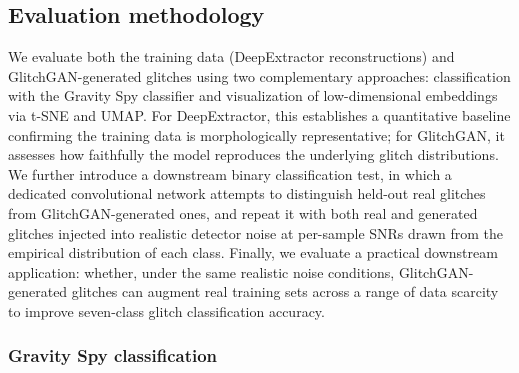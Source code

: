 \documentclass[reprint,nofootinbib,amsmath,amssymb,aps,floatfix]{revtex4-2}
\begin{document}
\subsection{Evaluation methodology}



We evaluate both the training data (DeepExtractor reconstructions) and GlitchGAN-generated glitches using two complementary approaches: classification with the Gravity Spy classifier and visualization of low-dimensional embeddings via t-SNE and UMAP. 
For DeepExtractor, this establishes a quantitative baseline confirming the training data is morphologically representative; for GlitchGAN, it assesses how faithfully the model reproduces the underlying glitch distributions.
We further introduce a downstream binary classification test, in which a dedicated convolutional network attempts to distinguish held-out real glitches from GlitchGAN-generated ones, and repeat it with both real and generated glitches injected into realistic detector noise at per-sample SNRs drawn from the empirical distribution of each class. 
Finally, we evaluate a practical downstream application: whether, under the same realistic noise conditions, GlitchGAN-generated glitches can augment real training sets across a range of data scarcity to improve seven-class glitch classification accuracy.

\subsubsection{Gravity Spy classification\label{sec:gspy_classification_methodology}}
\end{document}
